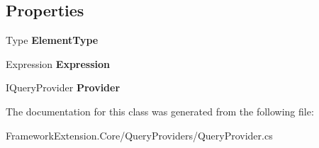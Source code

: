 \subsection*{Properties}
\begin{DoxyCompactItemize}
\item 
\hypertarget{class_framework_extension_1_1_core_1_1_query_providers_1_1_query_translator-g_a9174fe852650d95c0422f050fd9f7722}{Type {\bfseries Element\-Type}}\label{class_framework_extension_1_1_core_1_1_query_providers_1_1_query_translator-g_a9174fe852650d95c0422f050fd9f7722}

\item 
\hypertarget{class_framework_extension_1_1_core_1_1_query_providers_1_1_query_translator-g_ac7f4d4c5d6eb0ecadebb0972ccddfe26}{Expression {\bfseries Expression}}\label{class_framework_extension_1_1_core_1_1_query_providers_1_1_query_translator-g_ac7f4d4c5d6eb0ecadebb0972ccddfe26}

\item 
\hypertarget{class_framework_extension_1_1_core_1_1_query_providers_1_1_query_translator-g_a03460bcd4093d86d4937e1525af92666}{I\-Query\-Provider {\bfseries Provider}}\label{class_framework_extension_1_1_core_1_1_query_providers_1_1_query_translator-g_a03460bcd4093d86d4937e1525af92666}

\end{DoxyCompactItemize}


The documentation for this class was generated from the following file\-:\begin{DoxyCompactItemize}
\item 
Framework\-Extension.\-Core/\-Query\-Providers/Query\-Provider.\-cs\end{DoxyCompactItemize}

